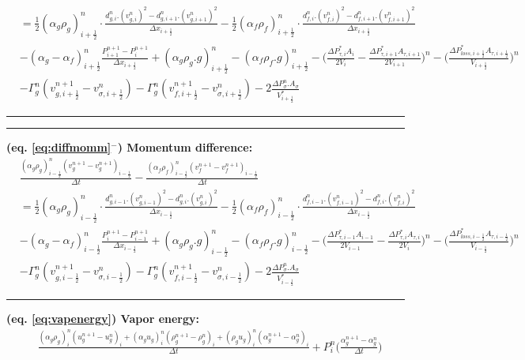 \documentclass[11pt,letterpaper,titlepage]{article}
\newcommand{\half}{\frac{1}{2}}
\begin{document}
\begin{landscape}
\begin{equation*}
\begin{aligned}
&=\half (\alpha_g \rho_{g})_{i+\half}^n \cdot\frac{d_{g,i}^n.(v_{g,i}^n)^2-d_{g,i+1}^n.(v_{g,i+1}^n)^2}{\Delta x_{i+\half}} 
-\half (\alpha_f \rho_{f})_{i+\half}^n \cdot\frac{d_{f,i}^n.(v_{f,i}^n)^2-d_{f,i+1}^n.(v_{f,i+1}^n)^2}{\Delta x_{i+\half}} \\
&-(\alpha_g-\alpha_f)_{i+\half}^n\frac{P_{i+1}^{n+1}-P_i^{n+1} }{\Delta x_{i+\half}} + (\alpha_g \rho_{g}.g)_{i+\half}^n - (\alpha_f \rho_{f}.g)_{i+\half}^n 
-\biggr(\frac{\Delta P_{\tau,i}^*A_i}{2V_i}-\frac{\Delta P_{\tau,i+1}^*A_{\tau,i+1}}{2V_{i+1}}\biggr)^n 
-\biggr(\frac{\Delta P_{loss,i+\half}^*A_{\tau,i+\half}}{V_{i+\half}}\biggr)^n\\
& - \Gamma_g^n (v_{g,i+\half}^{n+1} - v_{\sigma,i+\half}^n)- \Gamma_g^n (v_{f,i+\half}^{n+1} - v_{\sigma,i+\half}^n)-2\frac{\Delta P_{\sigma}^n.A_{\sigma}}{V_{i+\half}^*}
\end{aligned}
\end{equation*}
\noindent\rule{9in}{0.4pt}
\newpage
\noindent\rule{9in}{0.4pt}
\textbf{(eq. \ref{eq:diffmomm}$^-$) Momentum difference:}
\begin{equation*}
\begin{aligned}
&\frac{(\alpha_g\rho_g )_{i-\half}^n (v_g^{n+1} -v_g^{n+1})_{i-\half}}{\Delta t}
-\frac{(\alpha_f\rho_f )_{i-\half}^n (v_f^{n+1} -v_f^{n+1})_{i-\half}}{\Delta t}\\
&=\half (\alpha_g \rho_{g})_{i-\half}^n \cdot\frac{d_{g,i-1}^n.(v_{g,i-1}^n)^2-d_{g,i}^n.(v_{g,i}^n)^2}{\Delta x_{i-\half}} 
-\half (\alpha_f \rho_{f})_{i-\half}^n \cdot\frac{d_{f,i-1}^n.(v_{f,i-1}^n)^2-d_{f,i}^n.(v_{f,i}^n)^2}{\Delta x_{i-\half}} \\
&-(\alpha_g-\alpha_f)_{i-\half}^n\frac{P_{i}^{n+1}-P_{i-1}^{n+1} }{\Delta x_{i-\half}} + (\alpha_g \rho_{g}.g)_{i-\half}^n - (\alpha_f \rho_{f}.g)_{i-\half}^n 
-\biggr(\frac{\Delta P_{\tau,i-1}^*A_{i-1}}{2V_{i-1}}-\frac{\Delta P_{\tau,i}^*A_{\tau,i}}{2V_{i}}\biggr)^n 
-\biggr(\frac{\Delta P_{loss,i-\half}^*A_{\tau,i-\half}}{V_{i-\half}}\biggr)^n\\
& - \Gamma_g^n (v_{g,i-\half}^{n+1} - v_{\sigma,i-\half}^n)- \Gamma_g^n (v_{f,i-\half}^{n+1} - v_{\sigma,i-\half}^n)-2\frac{\Delta P_{\sigma}^n.A_{\sigma}}{V_{i-\half}^*}
\end{aligned}
\end{equation*}
\noindent\rule{9in}{0.4pt}
\textbf{(eq. \ref{eq:vapenergy}) Vapor energy:}
\begin{equation*}
\begin{aligned}
&\frac{(\alpha_g\rho_g)_i^n (u_g^{n+1}-u_g^{n})_i+(\alpha_g u_g)_i^n   (\rho_g^{n+1} - \rho_g^n)_i+(\rho_g u_g)_i^n     (\alpha_g^{n+1}-\alpha_g^n)_i}{\Delta t} + P_i^n \biggr( \frac{\alpha_g^{n+1}-\alpha_g^n}{\Delta t} \biggr)\\

\end{aligned}
\end{equation*}
\end{landscape}
\end{document}
